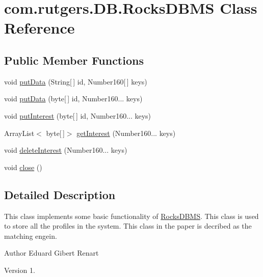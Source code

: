 \hypertarget{classcom_1_1rutgers_1_1DB_1_1RocksDBMS}{}\section{com.\+rutgers.\+D\+B.\+Rocks\+D\+B\+MS Class Reference}
\label{classcom_1_1rutgers_1_1DB_1_1RocksDBMS}
\subsection*{Public Member Functions}
\begin{DoxyCompactItemize}
\item 
void \hyperlink{classcom_1_1rutgers_1_1DB_1_1RocksDBMS_a3457d063685184152707f7e25b7bcb6c}{put\+Data} (String\mbox{[}$\,$\mbox{]} id, Number160\mbox{[}$\,$\mbox{]} keys)
\item 
void \hyperlink{classcom_1_1rutgers_1_1DB_1_1RocksDBMS_a8f19edec5bd60c75362223c880cd8a2f}{put\+Data} (byte\mbox{[}$\,$\mbox{]} id, Number160... keys)
\item 
void \hyperlink{classcom_1_1rutgers_1_1DB_1_1RocksDBMS_a61ac1a0207af7dff4cc4de59f10fbcc8}{put\+Interest} (byte\mbox{[}$\,$\mbox{]} id, Number160... keys)
\item 
Array\+List$<$ byte\mbox{[}$\,$\mbox{]}$>$ \hyperlink{classcom_1_1rutgers_1_1DB_1_1RocksDBMS_a58fdef51ec9602cabebb09a2448dc3c6}{get\+Interest} (Number160... keys)
\item 
void \hyperlink{classcom_1_1rutgers_1_1DB_1_1RocksDBMS_a00912a8d8d29f3692ffb6974ad7f683c}{delete\+Interest} (Number160... keys)
\item 
void \hyperlink{classcom_1_1rutgers_1_1DB_1_1RocksDBMS_a4231ce755ceddab79d715d44a9f98d7d}{close} ()
\end{DoxyCompactItemize}


\subsection{Detailed Description}
This class implements some basic functionality of \hyperlink{classcom_1_1rutgers_1_1DB_1_1RocksDBMS}{Rocks\+D\+B\+MS}. This class is used to store all the profiles in the system. This class in the paper is decribed as the matching engein.

\begin{DoxyAuthor}{Author}
Eduard Gibert Renart 
\end{DoxyAuthor}
\begin{DoxyVersion}{Version}
1. 
\end{DoxyVersion}


